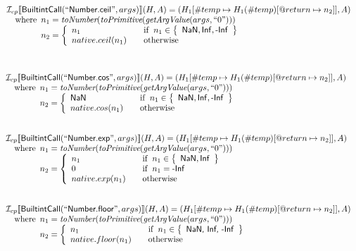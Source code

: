 \[\begin{array}{l}
\I _{cp}\lbr \SF{BuiltintCall}(``\SF{Number.ceil}",args)\rbr(H,A)
  = (H_1[\#temp \mapsto H_1(\#temp)[@return \mapsto n_2]], A)\\
\quad\wherec{
  n_1 = \hf{toNumber}(\hf{toPrimitive}(\hf{getArgValue}(args, ``0")))\\
  n_2 = \left\{
    \begin{array}{l@{\quad\quad}l}
      n_1 & \ifc{n_1 \in \set{\SF{NaN}, \SF{Inf}, \SF{-Inf}}}\\
      native.ceil(n_1) & \owc 
    \end{array}
  \right.
  }\\
\\\\


\end{array}
\]
\[
\begin{array}{l}


\I _{cp}\lbr \SF{BuiltintCall}(``\SF{Number.cos}",args)\rbr(H,A)
  = (H_1[\#temp \mapsto H_1(\#temp)[@return \mapsto n_2]], A)\\
\quad\wherec{
  n_1 = \hf{toNumber}(\hf{toPrimitive}(\hf{getArgValue}(args, ``0")))\\
  n_2 = \left\{
    \begin{array}{l@{\quad\quad}l}
      \SF{NaN} & \ifc{n_1 \in \set{\SF{NaN}, \SF{Inf}, \SF{-Inf}}}\\
      native.cos(n_1) & \owc 
    \end{array}
  \right.
  }\\
\\\\



\I _{cp}\lbr \SF{BuiltintCall}(``\SF{Number.exp}",args)\rbr(H,A)
  = (H_1[\#temp \mapsto H_1(\#temp)[@return \mapsto n_2]], A)\\
\quad\wherec{
  n_1 = \hf{toNumber}(\hf{toPrimitive}(\hf{getArgValue}(args, ``0")))\\
  n_2 = \left\{
    \begin{array}{l@{\quad\quad}l}
      n_1 & \ifc{n_1 \in \set{\SF{NaN}, \SF{Inf}}}\\
      0 & \ifc{n_1=\SF{-Inf}}\\
      native.exp(n_1) & \owc
    \end{array}
  \right.
  }\\
\\\\


\I _{cp}\lbr \SF{BuiltintCall}(``\SF{Number.floor}",args)\rbr(H,A)
  = (H_1[\#temp \mapsto H_1(\#temp)[@return \mapsto n_2]], A)\\
\quad\wherec{
  n_1 = \hf{toNumber}(\hf{toPrimitive}(\hf{getArgValue}(args, ``0")))\\
  n_2 = \left\{
    \begin{array}{l@{\quad\quad}l}
      n_1 & \ifc{n_1 \in \set{\SF{NaN, Inf, -Inf}}}\\
      native.floor(n_1) & \owc
    \end{array}
  \right.
  }\\
\\\\




\end{array}\]
